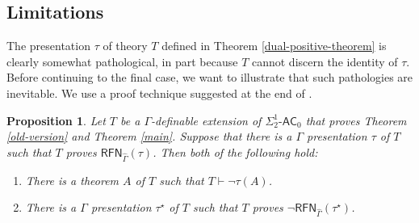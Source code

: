 \documentclass{amsart}
\newtheorem{proposition}[theorem]{Proposition}
\theoremstyle{definition}
\theoremstyle{remark}
\begin{document}
\subsection{Limitations}

The presentation $\tau$ of theory $T$ defined in Theorem \ref{dual-positive-theorem} is clearly somewhat pathological, in part because $T$ cannot discern the identity of $\tau$. Before continuing to the final case, we want to illustrate that such pathologies are inevitable. We use a proof technique suggested at the end of \cite{walsh2021incompleteness}.

\begin{proposition}\label{limitation}
Let $T$ be a $\Gamma$-definable extension of $\Sigma^1_2\text{-}\mathsf{AC}_0$ that proves Theorem \ref{old-version} and Theorem \ref{main}. Suppose that there is a $\Gamma$ presentation $\tau$ of $T$ such that $T$ proves $\mathsf{RFN}_{\widehat\Gamma}(\tau)$. Then both of the following hold:
\begin{enumerate}
    \item There is a theorem $A$ of $T$ such that $T\vdash \neg \tau(A)$.
    \item There is a $\Gamma$ presentation $\tau^\star$ of $T$ such that $T$ proves $\neg \mathsf{RFN}_{\widehat\Gamma}(\tau^\star)$.
\end{enumerate}
\end{proposition}
\end{document}
